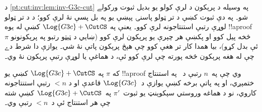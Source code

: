 \documentclass[../../../include/open-logic-section]{subfiles}
\begin{document}
د \cref{pt:cut:inv:lem:inv-G3c-cut} په وسيله د پرېکون د لرې کولو يو بديل ثبوت ورکولے شو۔ په دې ثبوت کښې د \CutCS{} تر ټولو پاسنۍ پېښې يو په بل پسې نۀ لرې کوو؛ د \CutCS{} د تر ټولو لوړې رتبې استنتاجونه لرې کوو۔ يعنې په $\Log{G3c} + \CutCS$ کښې له يوه !!a{proof}~$\pi$ څخه پيل کوو او پکښې هر چېرې يو پرېکون لرې کوو (ښايي د ټيټو رتبو په پرېکونونو ئې بدل کړو)، بيا همدا کار تر هغې کوو چې هېڅ پرېکون پاتې نۀ شي۔ يوازې دا شرط دے چې له هغه پرېکون څخه پورته چې لرې کوو ئې، د هماغې يا لوړې رتبې پرېکون نۀ وي۔

\begin{lem}
که $\pi$ په $\Log{G3c}+\CutCS$ کښې يو !!a{proof} وي چې په~$n$ رتبې د~\CutCS{} په استنتاج ختمېږي، او په پاتې برخه کښې يوازې د~$\Log{G3c}$ قاعدې او د $<n$ رتبې \CutCS{} استنتاجونه کاروي، نو د هماغه وروستي سېکوېنټ يو ثبوت~$\pi'$ په~$\Log{G3c} + \CutCS$ کښې شته چې هر \CutCS{} استنتاج ئې د~$<n$ رتبې وي۔
\end{lem}
\end{document}

